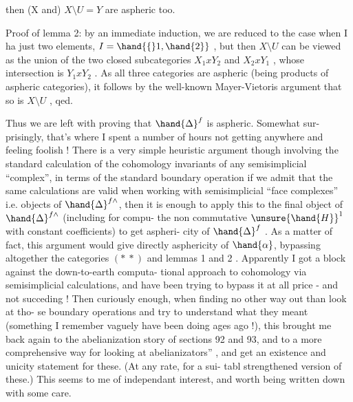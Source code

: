 
then (X and) $X\setminus U = Y$ are aspheric too.

Proof of lemma 2: by an immediate induction, we are reduced to
the case when I ha just two elements, $I = \hand{\{}1,\hand{2\}}$ , but then $X\setminus U$
can be viewed as the union of the two closed subcategories $X_1 x Y_2$ and
$X_2 x Y_1$ , whose intersection is $Y_1 x Y_2$ . As all three categories are
aspheric (being products of aspheric categories), it follows by the
well-known Mayer-Vietoris argument that so is $X\setminus U$ , qed.

Thus we are left with proving that $\hand{\Delta}^{f}$ is aspheric. Somewhat sur-%
prisingly, that's where I spent a number of hours not getting anywhere
and feeling foolish ! There is a very simple heuristic argument though
involving the standard calculation of the cohomology invariants of any
semisimplicial ``complex'', in terms of the standard boundary operation
\unsure{\xout{+}} if we admit that the same calculations are valid when working with
semisimplicial ``face complexes'' i.e. objects of  $\hand{\Delta}^{f\wedge}$, then it is
enough to apply this to the final object of $\hand{\Delta}^{f\wedge}$ (including for compu-%
  the non commutative $\unsure{\hand{H}}^1$ with constant coefficients) to get aspheri-%
city of $\hand{\Delta}^{f}$ . As a matter of fact, this argument would give directly
asphericity of $\hand{\alpha}$, bypassing altogether the categories $(*\ *)$ and lemmas
1 and 2 . Apparently I got a block against the down-to-earth computa-%
tional approach to cohomology via semisimplicial calculations, and
have been trying to bypass it at all price - and not succeding !
Then curiously enough, when finding no other way out than look at tho-%
se boundary operations and try to understand what they meant (something
I remember vaguely have been doing   ages ago !), this brought
me back again to the abelianization story of sections 92 and 93, and
to a more comprehensive way for looking at abelianizators'' , and get
an existence and unicity statement for these. (At any rate, for a sui-%
tabl strengthened version of these.) This\xout{,} seems to me of independant
interest, and worth being written down with some care.

